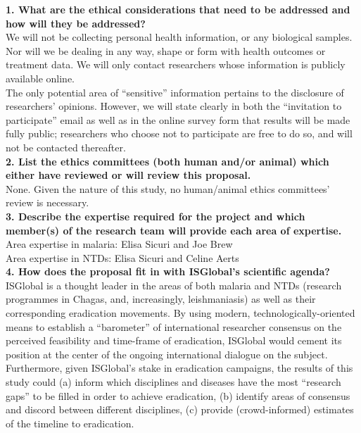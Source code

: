 \documentclass{article}
\begin{document}
\noindent \textbf{1. What are the ethical considerations that need to be addressed and how will they be addressed?} \\
We will not be collecting personal health information, or any biological samples. Nor will we be dealing in any way, shape or form with health outcomes or treatment data.
We will only contact researchers whose information is publicly available online.   \\

\noindent The only potential area of “sensitive” information pertains to the disclosure of researchers’ opinions. However, we will state clearly in both the “invitation to participate” email as well as in the online survey form that results will be made fully public; researchers who choose not to participate are free to do so, and will not be contacted thereafter.  \\


\noindent \textbf{2. List the ethics committees (both human and/or animal) which either have reviewed or will review this proposal.} \\


\noindent None. Given the nature of this study, no human/animal ethics committees’ review is necessary. \\

\noindent \textbf{3. Describe the expertise required for the project and which member(s) of the research team will provide each area of expertise.} \\


\noindent Area expertise in malaria: Elisa Sicuri and Joe Brew \\
\noindent Area expertise in NTDs: Elisa Sicuri and Celine Aerts \\


\noindent \textbf{4. How does the proposal fit in with ISGlobal’s scientific agenda?} \\ 


\noindent ISGlobal is a thought leader in the areas of both malaria and NTDs (research programmes in Chagas, and, increasingly, leishmaniasis) as well as their corresponding eradication movements. By using modern, technologically-oriented means to establish a “barometer” of international researcher consensus on the perceived feasibility and time-frame of eradication, ISGlobal would cement its position at the center of the ongoing international dialogue on the subject. Furthermore, given ISGlobal’s stake in eradication campaigns, the results of this study could (a) inform which disciplines and diseases have the most “research gaps” to be filled in order to achieve eradication, (b) identify areas of consensus and discord between different disciplines, (c) provide (crowd-informed) estimates of the timeline to eradication. \\
\end{document}
